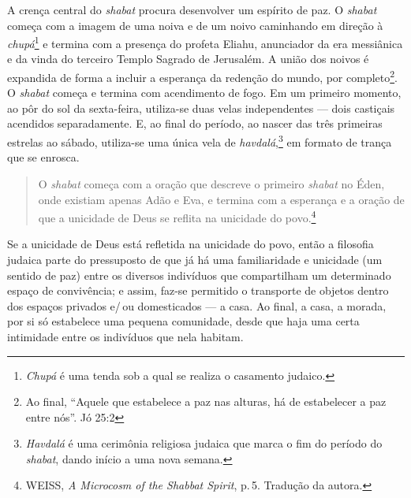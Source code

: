 A crença central do \emph{shabat} procura desenvolver um espírito de
paz. O \emph{shabat} começa com a imagem de uma noiva e de um noivo
caminhando em direção à \emph{chupá}\footnote{\emph{Chupá} é uma tenda
  sob a qual se realiza o casamento judaico.} e termina com a presença
do profeta Eliahu, anunciador da era messiânica e da vinda do terceiro
Templo Sagrado de Jerusalém. A união dos noivos é expandida de forma a
incluir a esperança da redenção do mundo, por completo\footnote{Ao
  final, ``Aquele que estabelece a paz nas alturas, há de
  estabelecer a paz entre nós''. Jó 25:2}. O \emph{shabat} começa e termina com acendimento de
fogo. Em um primeiro momento, ao pôr do sol da sexta-feira, utiliza-se
duas velas independentes --- dois castiçais acendidos separadamente. E,
ao final do período, ao nascer das três primeiras estrelas ao sábado,
utiliza-se uma única vela de \emph{havdalá},\footnote{\emph{Havdalá} é
  uma cerimônia religiosa judaica que marca o fim do período do
  \emph{shabat}, dando início a uma nova semana.} em formato de trança
que se enrosca.

\begin{quote}
O \emph{shabat} começa com a oração que descreve o primeiro \emph{shabat} no Éden,
onde existiam apenas Adão e Eva, e termina com a esperança e a oração de
que a unicidade de Deus se reflita na unicidade do povo.\footnote{WEISS,
  \emph{A Microcosm of the Shabbat Spirit}, p.\,5. Tradução da autora.}
\end{quote}

Se a unicidade de Deus está refletida na unicidade do povo, então a
filosofia judaica parte do pressuposto de que já há uma familiaridade e
unicidade (um sentido de paz) entre os diversos indivíduos que
compartilham um determinado espaço de convivência; e assim, faz-se
permitido o transporte de objetos dentro dos espaços privados e/\,ou
domesticados --- a casa. Ao final, a casa, a morada, por si só
estabelece uma pequena comunidade, desde que haja uma certa intimidade
entre os indivíduos que nela habitam.

